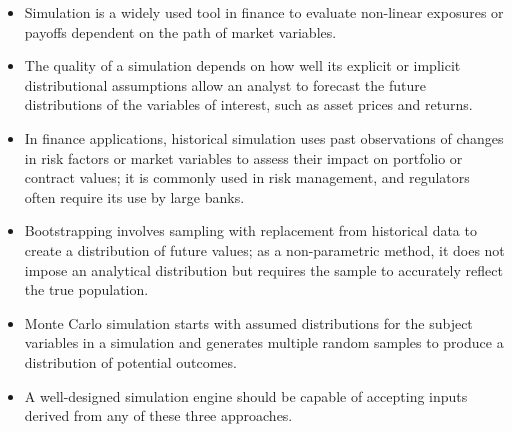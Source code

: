 \begin{itemize}
	\item Simulation is a widely used tool in finance to evaluate non-linear exposures or payoffs dependent on the path of market variables.
	\item The quality of a simulation depends on how well its explicit or implicit distributional assumptions allow an analyst to forecast the future distributions of the variables of interest, such as asset prices and returns.
	\item In finance applications, historical simulation uses past observations of changes in risk factors or market variables to assess their impact on portfolio or contract values; it is commonly used in risk management, and regulators often require its use by large banks.
	\item Bootstrapping involves sampling with replacement from historical data to create a distribution of future values; as a non-parametric method, it does not impose an analytical distribution but requires the sample to accurately reflect the true population.
	\item Monte Carlo simulation starts with assumed distributions for the subject variables in a simulation and generates multiple random samples to produce a distribution of potential outcomes.
	\item A well-designed simulation engine should be capable of accepting inputs derived from any of these three approaches.
\end{itemize}
